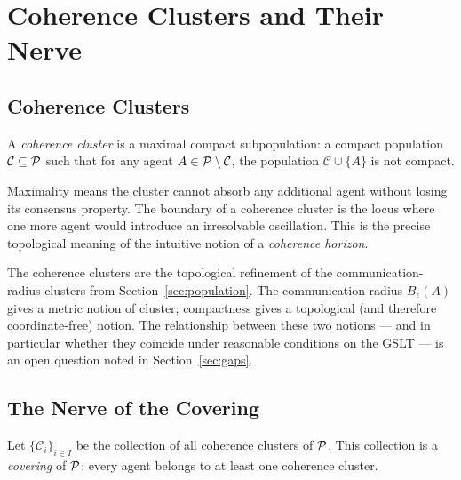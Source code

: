 \chapter{Coherence Clusters and Their Nerve}
\label{sec:clusters}

\section{Coherence Clusters}

\begin{definition}
A \emph{coherence cluster} is a maximal compact subpopulation:
a compact population $\mathcal{C} \subseteq \mathcal{P}$ such that
for any agent $A \in \mathcal{P} \setminus \mathcal{C}$, the population
$\mathcal{C} \cup \{A\}$ is not compact.
\end{definition}

\begin{remark}
Maximality means the cluster cannot absorb any additional agent
without losing its consensus property.
The boundary of a coherence cluster is the locus where one more
agent would introduce an irresolvable oscillation.
This is the precise topological meaning of the intuitive notion
of a \emph{coherence horizon}.
\end{remark}

\begin{remark}
The coherence clusters are the topological refinement of the
communication-radius clusters from Section~\ref{sec:population}.
The communication radius $B_\epsilon(A)$ gives a metric notion of
cluster; compactness gives a topological (and therefore
coordinate-free) notion.
The relationship between these two notions --- and in particular
whether they coincide under reasonable conditions on the GSLT ---
is an open question noted in Section~\ref{sec:gaps}.
\end{remark}

\section{The Nerve of the Covering}

\begin{definition}
Let $\{\mathcal{C}_i\}_{i \in I}$ be the collection of all coherence
clusters of $\mathcal{P}$.
This collection is a \emph{covering} of $\mathcal{P}$: every agent belongs
to at least one coherence cluster.
\end{definition}


